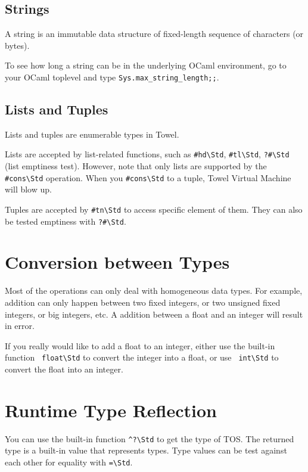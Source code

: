 \documentclass{report}
\newcommand{\mstd}[1]{\texttt{#1\textbackslash Std}}
\newcommand{\mtilde}[1]{\textasciitilde}
\begin{document}
\subsection{Strings}

A string is an immutable data structure of fixed-length sequence of characters (or bytes).

\begin{mdframed}[style=detail]
  To see how long a string can be in the underlying OCaml environment, go to your OCaml toplevel and type \texttt{Sys.max\_string\_length;;}.
\end{mdframed}

\subsection{Lists and Tuples}

Lists and tuples are enumerable types in Towel.

Lists are accepted by list-related functions, such as \mstd{\#hd}, \mstd{\#tl}, \mstd{?\#} (list emptiness test). However, note that only lists are supported by the \mstd{\#cons} operation. When you \mstd{\#cons} to a tuple, Towel Virtual Machine will blow up.

Tuples are accepted by \mstd{\#tn} to access specific element of them. They can also be tested emptiness with \mstd{?\#}.

\section{Conversion between Types}

Most of the operations can only deal with homogeneous data types. For example, addition can only happen between two fixed integers, or two unsigned fixed integers, or big integers, etc. A addition between a float and an integer will result in error.

If you really would like to add a float to an integer, either use the built-in function \mstd{\mtilde ~float} to convert the integer into a float, or use \mstd{\mtilde  ~int} to convert the float into an integer.

\section{Runtime Type Reflection}

You can use the built-in function \mstd{\string^?} to get the type of TOS. The returned type is a built-in value that represents types. Type values can be test against each other for equality with \mstd{\string=}.
\end{document}
